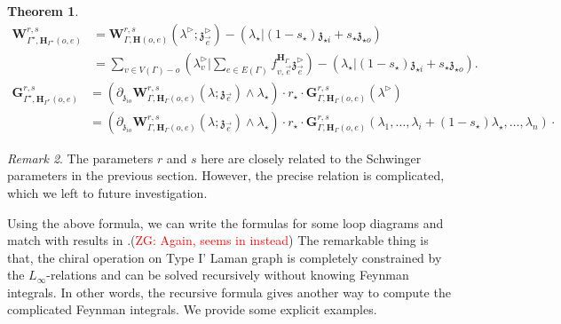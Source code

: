 \documentclass[11pt]{amsart}
\newtheorem{thm}{Theorem}[section]
\newtheorem{cor}[thm]{Corollary}
\theoremstyle{definition}
\theoremstyle{remark}
\newtheorem{rem}[thm]{Remark}
\numberwithin{equation}{section}
\newcommand{\Gui}[1]{(\textcolor{red}{ZG: #1})}
\begin{document}
\begin{thm}
\begin{align*}
      \mathbf{W}^{r,s}_{\Gamma^{\star},\mathbf{H}_{\Gamma^{\star}}(o,e)} &= \mathbf{W}^{r,s}_{\Gamma,\mathbf{H}(o,e)}(\lambda^\triangleright;\mathfrak{z}^\triangleright_{\vec{e}}) -\left(\lambda_{\star}|(1-s_{\star})\mathfrak{z}_{\star i}+s_{\star}\mathfrak{z}_{\star o}\right)\\
   & =\sum_{v\in V(\Gamma)-o}(\lambda^\triangleright_v|\sum_{e\in E(\Gamma)}f^{\mathbf{H}_{\Gamma}}_{v,\vec{e}}\mathfrak{z}^\triangleright_{\vec{e}})-\left(\lambda_{\star}|(1-s_{\star})\mathfrak{z}_{\star i}+s_{\star}\mathfrak{z}_{\star o}\right).
\end{align*}
\begin{align*}
  \mathbf{G}^{r,s}_{\Gamma^{\star},\mathbf{H}_{\Gamma^{\star}}(o,e)} &= \left(\partial_{\mathfrak{z}_{io}}\mathbf{W}^{r,s}_{\Gamma,\mathbf{H}_{\Gamma}(o,e)}(\lambda;\mathfrak{z}_{\vec{e}})\wedge\lambda_{\star}\right)\cdot  r_{\star}\cdot\mathbf{G}^{r,s}_{\Gamma,\mathbf{H}_{\Gamma}(o,e)}(\lambda^\triangleright) \\
   & =\left(\partial_{\mathfrak{z}_{io}}\mathbf{W}^{r,s}_{\Gamma,\mathbf{H}_{\Gamma}(o,e)}(\lambda;\mathfrak{z}_{\vec{e}})\wedge\lambda_{\star}\right)\cdot r_{\star}\cdot\mathbf{G}^{r,s}_{\Gamma,\mathbf{H}_{\Gamma}(o,e)}(\lambda_1,\dots,\lambda_i+(1-s_{\star})\lambda_{\star},\dots,\lambda_{n})\cdot
\end{align*}

\end{thm}

\iffalse
We have following corollaries.
\begin{cor}
  The value $\mu_{V(\Gamma)}\left(W_{\Gamma}(\mathfrak{z}_{\vec{e}})\right)$ for a type 1 Lamman graph is determined by the chiral 2-operation.
\end{cor}
\fi
\begin{rem}
    The parameters $r$ and $s$ here are closely related to the Schwinger parameters in the previous section. However, the precise relation is complicated, which we left to future investigation.
\end{rem}

Using the above formula, we can write the formulas for some loop diagrams and match with results in \cite{Gaiotto:2024gii}.\Gui{Again, seems in \cite{budzik2023feynman} instead}
The remarkable thing is that, the chiral operation on Type I' Laman graph is completely constrained by the $L_{\infty}
$-relations and can be solved recursively without knowing Feynman integrals.
In other words, the recursive formula gives another way to compute the complicated Feynman integrals.
We provide some explicit examples.
\end{document}
